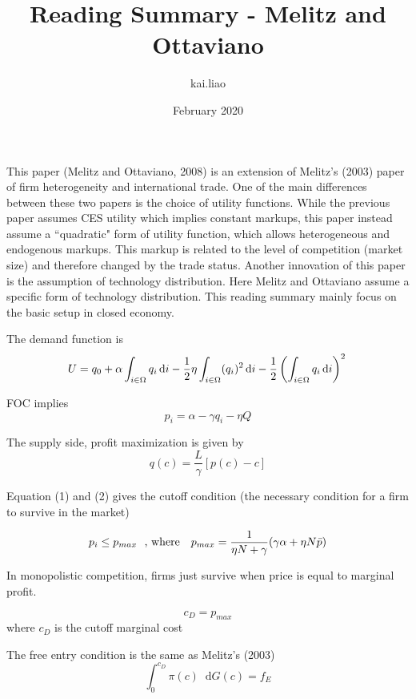 \documentclass{article}
\title{Reading Summary - Melitz and Ottaviano}
\author{kai.liao }
\date{February 2020}
\newcommand*\diff{\mathop{}\!\mathrm{d}}
\begin{document}
\maketitle

This paper (Melitz and Ottaviano, 2008) is an extension of Melitz's (2003) paper of firm heterogeneity and international trade. One of the  main differences between these two papers is the choice of utility functions. While the previous paper assumes CES utility which implies constant markups, this paper instead assume a “quadratic" form of utility function, which allows heterogeneous and endogenous markups. This markup is related to the level of competition (market size) and therefore changed by the trade status. Another innovation of this paper is the assumption of technology distribution. Here Melitz and Ottaviano assume a specific form of technology distribution. This reading summary mainly focus on the basic setup in closed economy.


The demand function is 
\begin{equation}
    U = q_0 + \alpha \int_{i\in \Omega}q_i\diff{i}-\frac{1}{2} \eta\int_{i\in \Omega}(q_i)^2\diff{i}-\frac{1}{2}\left( \int_{i\in \Omega}q_i\diff{i} \right)^2\\
\end{equation}

FOC implies
\begin{equation}
    p_i = \alpha - \gamma q_i - \eta Q
\end{equation}

The supply side, profit maximization is given by 
\begin{equation}
    q(c) = \frac{L}{\gamma}[p(c)-c]
\end{equation}

Equation (1) and (2) gives the cutoff condition (the necessary condition for a firm to survive in the market)

\begin{equation}
    p_i \leq p_{max} \text{~~,~where~~~}p_{max} = \frac{1}{\eta N +\gamma}(\gamma \alpha + \eta N \Bar{p})
\end{equation}

In monopolistic competition, firms just survive when price is equal to marginal profit.

\begin{equation}
    c_D = p_{max} 
\end{equation}
where $c_D$ is the cutoff marginal cost

The free entry condition is the same as Melitz's (2003)
\begin{equation}
    \int_0^{c_D} \pi(c) \diff{G(c)} = f_E
\end{equation}
\end{document}
